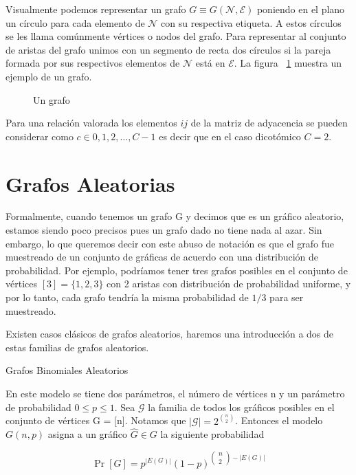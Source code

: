 Visualmente podemos representar un grafo $G \equiv G ( \mathcal { N } , \mathcal { E } )$ poniendo en el plano un círculo para cada elemento de $\mathcal{N}$ con su respectiva etiqueta. A estos círculos se les llama comúnmente vértices o nodos del grafo. Para representar al conjunto de aristas del grafo unimos con un segmento de recta dos círculos si la pareja formada por sus respectivos elementos de $\mathcal{N}$ está en $\mathcal{E}$. La figura ~\ref{fig:undir-graph} muestra un ejemplo de un grafo.

\begin{figure}
\centering

\caption[Ejemplo de un grafo]{Un grafo}
\label{fig:undir-graph}
\end{figure}

Para una relación valorada los elementos $ij$ de la matriz de adyacencia se pueden considerar como $c \in {0, 1, 2,\dots, C-1}$ es decir que en el caso dicotómico $C = 2$.


\section{Grafos Aleatorias}

Formalmente, cuando tenemos un grafo G y decimos que es un gráfico aleatorio, estamos siendo poco precisos pues un grafo dado no tiene nada al azar. Sin embargo, lo que queremos decir con este abuso de notación es que el grafo fue muestreado de un conjunto de gráficas de acuerdo con una distribución de probabilidad. Por ejemplo, podríamos tener tres grafos posibles en el conjunto de vértices $[3] = \{1, 2, 3\}$ con 2 aristas con distribución de probabilidad uniforme, y por lo tanto, cada grafo tendría la misma probabilidad  de $1/3$ para ser muestreado. 

Existen casos clásicos de grafos aleatorios, haremos una introducción a dos de estas familias de grafos aleatorios.


\begin{example}{Grafos Binomiales Aleatorios}

En este modelo se tiene dos parámetros, el número de vértices n y un parámetro de probabilidad $0 \leq p \leq 1$. Sea $\mathcal{G}$ la familia de todos los gráficos posibles en el conjunto de vértices G = [n]. Notamos que $|\mathcal{G}| = 2 ^{n \choose 2}$. Entonces el modelo $G(n, p)$ asigna a un gráfico $\hat{G} \in G$ la siguiente probabilidad

$$\operatorname { Pr } [ G ] = p ^ { | E ( G ) | } ( 1 - p ) ^ {{ \left( \begin{array} { l } { n } \\ { 2 } \end{array} \right) - | E ( G ) |} }$$

\end{example}

